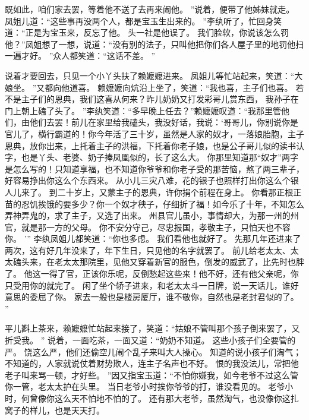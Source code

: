 既如此，咱们家去罢，等着他不送了去再来闹他。
”说着，便带了他姊妹就走。
凤姐儿道：“这些事再没两个人，都是宝玉生出来的。
”李纨听了，忙回身笑道：“正是为宝玉来，反忘了他。
头一社是他误了。
我们脸软，你说该怎么罚他？”凤姐想了一想，说道：“没有别的法子，只叫他把你们各人屋子里的地罚他扫一遍才好。
”众人都笑道：“这话不差。
”\par
说着才要回去，只见一个小丫头扶了赖嬷嬷进来。
凤姐儿等忙站起来，笑道：“大娘坐。
”又都向他道喜。
赖嬷嬷向炕沿上坐了，笑道：“我也喜，主子们也喜。
若不是主子们的恩典，我们这喜从何来？昨儿奶奶又打发彩哥儿赏东西，
我孙子在门上朝上磕了头了。
”李纨笑道：“多早晚上任去？”赖嬷嬷叹道：“我那里管他们，由他们去罢！前儿在家里给我磕头，我没好话，我说：‘哥哥儿，你别说你是官儿了，横行霸道的！你今年活了三十岁，虽然是人家的奴才，一落娘胎胞，主子恩典，放你出来，上托着主子的洪福，下托着你老子娘，也是公子哥儿似的读书认字，也是丫头、老婆、奶子捧凤凰似的，长了这么大。
你那里知道那“奴才”两字是怎么写的！只知道享福，也不知道你爷爷和你老子受的那苦恼，熬了两三辈子，好容易挣出你这么个东西来。
从小儿三灾八难，花的银子也照样打出你这么个银人儿来了。
到二十岁上，又蒙主子的恩典，许你捐个前程在身上。
你看那正根正苗的忍饥挨饿的要多少？你一个奴才秧子，仔细折了福！如今乐了十年，不知怎么弄神弄鬼的，求了主子，又选了出来。
州县官儿虽小，事情却大，为那一州的州官，就是那一方的父母。
你不安分守己，尽忠报国，孝敬主子，只怕天也不容你。
’”
李纨凤姐儿都笑道：“你也多虑。
我们看他也就好了。
先那几年还进来了两次，这有好几年没来了，年下生日，只见他的名字就罢了。
前儿给老太太、太太磕头来，在老太太那院里，见他又穿着新官的服色，倒发的威武了，比先时也胖了。
他这一得了官，正该你乐呢，反倒愁起这些来！他不好，还有他父亲呢，你只受用你的就完了。
闲了坐个轿子进来，和老太太斗一日牌，说一天话儿，谁好意思的委屈了你。
家去一般也是楼房厦厅，谁不敬你，自然也是老封君似的了。
”\par
平儿斟上茶来，赖嬷嬷忙站起来接了，笑道：“姑娘不管叫那个孩子倒来罢了，又折受我。
”
说着，一面吃茶，一面又道：“奶奶不知道。
这些小孩子们全要管的严。
饶这么严，他们还偷空儿闹个乱子来叫大人操心。
知道的说小孩子们淘气；不知道的，人家就说仗着财势欺人，连主子名声也不好。
恨的我没法儿，常把他老子叫来骂一顿，才好些。
”因又指宝玉道：“不怕你嫌我，如今老爷不过这么管你一管，老太太护在头里。
当日老爷小时挨你爷爷的打，谁没看见的。
老爷小时，何曾像你这么天不怕地不怕的了。
还有那大老爷，虽然淘气，也没像你这扎窝子的样儿，也是天天打。
